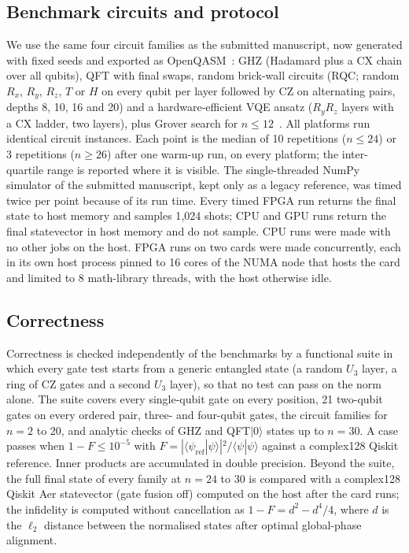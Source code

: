 \begin{table}
\centering
\caption{Hardware and software configuration (captured by \texttt{scripts/capture\_env.sh}).}\label{tab:hwconfig}
\small

\end{table}

\subsection{Benchmark circuits and protocol}\label{subsec:protocol}

We use the same four circuit families as the submitted manuscript, now generated with fixed seeds and exported as OpenQASM~\cite{cross2017openqasm}: GHZ (Hadamard plus a CX chain over all qubits), QFT with final swaps, random brick-wall circuits (RQC; random $R_x$, $R_y$, $R_z$, $T$ or $H$ on every qubit per layer followed by CZ on alternating pairs, depths 8, 10, 16 and 20) and a hardware-efficient VQE ansatz ($R_y R_z$ layers with a CX ladder, two layers), plus Grover search for $n\leq 12$~\cite{grover1996fast,peruzzo2014variational,boixo2018characterizing}. All platforms run identical circuit instances. Each point is the median of 10 repetitions ($n\leq 24$) or 3 repetitions ($n\geq 26$) after one warm-up run, on every platform; the inter-quartile range is reported where it is visible. The single-threaded NumPy simulator of the submitted manuscript, kept only as a legacy reference, was timed twice per point because of its run time. Every timed FPGA run returns the final state to host memory and samples 1{,}024 shots; CPU and GPU runs return the final statevector in host memory and do not sample. CPU runs were made with no other jobs on the host. FPGA runs on two cards were made concurrently, each in its own host process pinned to 16 cores of the NUMA node that hosts the card and limited to 8 math-library threads, with the host otherwise idle.

\subsection{Correctness}\label{subsec:correctness-method}

Correctness is checked independently of the benchmarks by a functional suite in which every gate test starts from a generic entangled state (a random $U_3$ layer, a ring of CZ gates and a second $U_3$ layer), so that no test can pass on the norm alone. The suite covers every single-qubit gate on every position, 21 two-qubit gates on every ordered pair, three- and four-qubit gates, the circuit families for $n=2$ to 20, and analytic checks of GHZ and QFT$|0\rangle$ states up to $n=30$. A case passes when $1-F\leq 10^{-5}$ with $F=|\langle\psi_\mathrm{ref}|\psi\rangle|^2/\langle\psi|\psi\rangle$ against a complex128 Qiskit reference. Inner products are accumulated in double precision. Beyond the suite, the full final state of every family at $n=24$ to 30 is compared with a complex128 Qiskit Aer statevector (gate fusion off) computed on the host after the card runs; the infidelity is computed without cancellation as $1-F=d^2-d^4/4$, where $d$ is the $\ell_2$ distance between the normalised states after optimal global-phase alignment.

